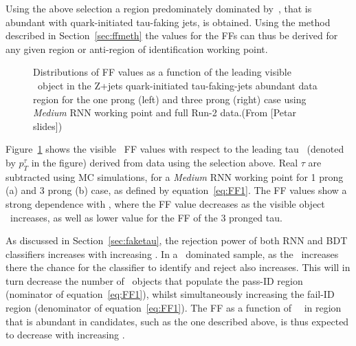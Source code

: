	Using the above selection a region predominately dominated by \Zjets\,, that is abundant with quark-initiated tau-faking jets, is obtained. 
	Using the method described in Section~\ref{sec:ffmeth} the values for the FFs can thus be derived for any given region or anti-region of identification working point. 
	
	\begin{figure}[!htb]
	\begin{center}
			 				\hspace{0.05\textwidth}
							\hspace{0.05\textwidth}
	\end{center}
	\caption{Distributions of FF values as a function of the leading visible \htau\ object in the Z+jets quark-initiated tau-faking-jets abundant data region for the one prong (left) and three prong (right) case using \textit{Medium} \ac{RNN} working point and full Run-2 data.(From [Petar slides])}
	\label{fig:Zjets_data_FF}
	\end{figure}
	Figure~\ref{fig:Zjets_data_FF} shows the visible \htau\ \ac{FF} values with respect to the leading tau \pt\ (denoted by $p_T^{\tau}$ in the figure) derived from data using the selection above. Real $\tau$ are subtracted using \ac{MC} simulations, for a \textit{Medium} \ac{RNN} working point for 1 prong (a) and 3 prong (b) case, as defined by equation~\ref{eq:FF1}. The FF values show a strong dependence with \pt, where the FF value decreases as the visible \htau object \pt\ increases, as well as lower value for the FF of the 3 pronged tau. 	

As discussed in Section~\ref{sec:faketau}, the rejection power of both \ac{RNN} and \ac{BDT} classifiers increases with increasing \pt. In a \ftau\ dominated sample, as the \pt\ increases there the chance for the classifier to identify and reject \ftau also increases. This will in turn decrease the number of \htau\ objects that populate the pass-ID region (nominator of equation~\ref{eq:FF1}), whilst simultaneously increasing the fail-ID region (denominator of equation~\ref{eq:FF1}). The \ac{FF} as a function of \htau\ \pt\ in region that is abundant in \ftau candidates, such as the one described above, is thus expected to decrease with increasing \pt.

 

